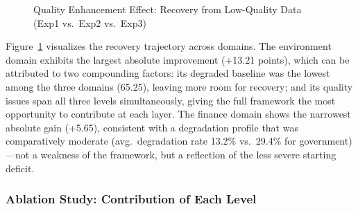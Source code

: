 \documentclass[runningheads]{llncs}
\begin{document}
\begin{figure}[H]
    \centering
    \caption{Quality Enhancement Effect: Recovery from Low-Quality Data (Exp1 vs.\ Exp2 vs.\ Exp3)}
    \label{fig:enhancement_effect}
\end{figure}

Figure~\ref{fig:enhancement_effect} visualizes the recovery trajectory across domains. The environment domain exhibits the largest absolute improvement (+13.21 points), which can be attributed to two compounding factors: its degraded baseline was the lowest among the three domains (65.25), leaving more room for recovery; and its quality issues span all three levels simultaneously, giving the full framework the most opportunity to contribute at each layer. The finance domain shows the narrowest absolute gain (+5.65), consistent with a degradation profile that was comparatively moderate (avg.\ degradation rate 13.2\% vs.\ 29.4\% for government)—not a weakness of the framework, but a reflection of the less severe starting deficit.

\subsubsection{Ablation Study: Contribution of Each Level}
\end{document}
